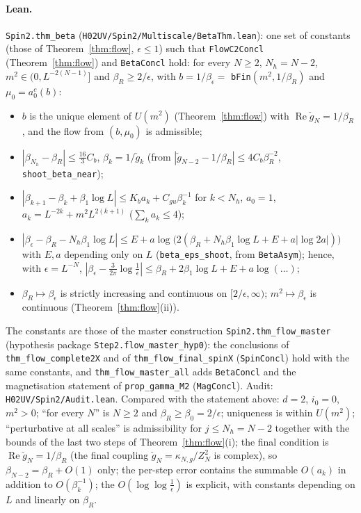 \documentclass[11pt]{amsart}
\theoremstyle{definition}
\theoremstyle{remark}
\numberwithin{equation}{section}
\begin{document}
\paragraph{Lean.} \texttt{Spin2.thm\_beta} (\texttt{H02UV/Spin2/Multiscale/BetaThm.lean}): one set of constants (those of
Theorem~\ref{thm:flow}, $\epsilon\le1$) such that \texttt{FlowC2Concl} (Theorem~\ref{thm:flow}) and \texttt{BetaConcl} hold:
for every $N\ge2$, $N_h=N-2$, $m^2\in(0,L^{-2(N-1)}]$ and $\beta_R\ge2/\epsilon$, with $b=1/\beta_\epsilon=$
\texttt{bFin}$(m^2,1/\beta_R)$ and $\mu_0=a_0^c(b)$:
\begin{itemize}
\item $b$ is the unique element of $U(m^2)$ (Theorem~\ref{thm:flow}) with $\operatorname{Re}\check g_N=1/\beta_R$, and the flow
  from $(b,\mu_0)$ is admissible;
\item $|\beta_{N_h}-\beta_R|\le\frac{16}3C_b$, $\beta_k=1/\check g_k$ (from $|\check g_{N-2}-1/\beta_R|\le4C_b\beta_R^{-2}$,
  \texttt{shoot\_beta\_near});
\item $|\beta_{k+1}-\beta_k+\beta_1\log L|\le K_ba_k+C_{gu}\beta_k^{-1}$ for $k<N_h$, $a_0=1$, $a_k=L^{-2k}+m^2L^{2(k+1)}$
  ($\sum_ka_k\le4$);
\item $|\beta_\epsilon-\beta_R-N_h\beta_1\log L|\le E+a\log\bigl(2(\beta_R+N_h\beta_1\log L+E+a|\log2a|)\bigr)$ with $E,a$
  depending only on $L$ (\texttt{beta\_eps\_shoot}, from \texttt{BetaAsym}); hence, with $\epsilon=L^{-N}$,
  $|\beta_\epsilon-\frac3{2\pi}\log\frac1\epsilon|\le\beta_R+2\beta_1\log L+E+a\log(\dots)$;
\item $\beta_R\mapsto\beta_\epsilon$ is strictly increasing and continuous on $[2/\epsilon,\infty)$; $m^2\mapsto\beta_\epsilon$ is
  continuous (Theorem~\ref{thm:flow}(ii)).
\end{itemize}
The constants are those of the master construction \texttt{Spin2.thm\_flow\_master} (hypothesis package
\texttt{Step2.flow\_master\_hyp0}): the conclusions of \texttt{thm\_flow\_complete2X} and of \texttt{thm\_flow\_final\_spinX}
(\texttt{SpinConcl}) hold with the same constants, and \texttt{thm\_flow\_master\_all} adds \texttt{BetaConcl} and the
magnetisation statement of \texttt{prop\_gamma\_M2} (\texttt{MagConcl}). Audit: \texttt{H02UV/Spin2/Audit.lean}.
Compared with the statement above: $d=2$, $i_0=0$, $m^2>0$; ``for every $N$'' is $N\ge2$ and $\beta_R\ge\beta_0=2/\epsilon$;
uniqueness is within $U(m^2)$; ``perturbative at all scales'' is admissibility for $j\le N_h=N-2$ together with the bounds of
the last two steps of Theorem~\ref{thm:flow}(i); the final condition is $\operatorname{Re}\check g_N=1/\beta_R$ (the final
coupling $\check g_N=\kappa_{N,g}/Z_N^2$ is complex), so $\beta_{N-2}=\beta_R+O(1)$ only; the per-step error contains the
summable $O(a_k)$ in addition to $O(\beta_k^{-1})$; the $O(\log\log\frac1\epsilon)$ is explicit, with constants depending on $L$
and linearly on $\beta_R$.
\end{document}
